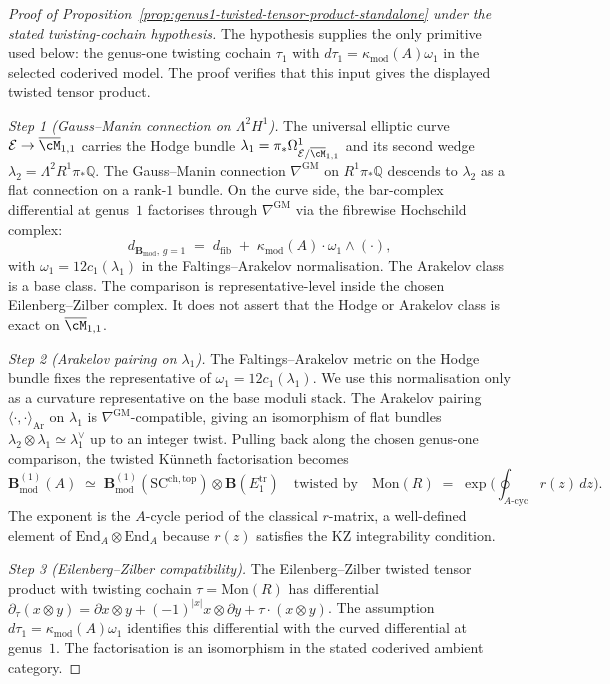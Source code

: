 \documentclass[11pt]{amsart}
\theoremstyle{definition}
\theoremstyle{remark}
\providecommand{\Bmod}{\mathbf{B}_{\mathrm{mod}}}
\begin{document}
\begin{proof}[Proof of Proposition~\ref{prop:genus1-twisted-tensor-product-standalone}
under the stated twisting-cochain hypothesis]
The hypothesis supplies the only primitive used below: the
genus-one twisting cochain $\tau_1$ with
$d\tau_1=\kappa_{\mathrm{mod}}(A)\omega_1$ in the selected coderived
model.  The proof verifies that this input gives the displayed
twisted tensor product.

\emph{Step 1 (Gauss--Manin connection on $\Lambda^2 H^1$).}
The universal elliptic curve
$\mathcal{E} \to \overline{\cM}_{1,1}$ carries the Hodge bundle
$\lambda_1 = \pi_* \Omega^1_{\mathcal{E}/\overline{\cM}_{1,1}}$ and
its second wedge
$\lambda_2 = \Lambda^2 R^1\pi_* \mathbb{Q}$. The Gauss--Manin
connection $\nabla^{\mathrm{GM}}$ on
$R^1\pi_* \mathbb{Q}$ descends to $\lambda_2$ as a flat connection
on a rank-$1$ bundle. On the curve side, the bar-complex differential
at genus~$1$ factorises through $\nabla^{\mathrm{GM}}$ via the
fibrewise Hochschild complex:
\[
  d_{\Bmod,\, g=1}
  \;=\;
    d_{\mathrm{fib}} \;+\; \kappa_{\mathrm{mod}}(A) \cdot \omega_1
    \wedge (\cdot),
\]
with $\omega_1=12c_1(\lambda_1)$ in the Faltings--Arakelov
normalisation. The Arakelov class is a base class.  The comparison is
representative-level inside the chosen Eilenberg--Zilber complex.  It
does not assert that the Hodge or Arakelov class is exact on
$\overline{\cM}_{1,1}$.

\emph{Step 2 (Arakelov pairing on $\lambda_1$).}
The Faltings--Arakelov metric on the Hodge bundle fixes the
representative of $\omega_1=12c_1(\lambda_1)$.  We use this
normalisation only as a curvature representative on the base
moduli stack.  The Arakelov pairing
$\langle\cdot, \cdot\rangle_{\mathrm{Ar}}$ on
$\lambda_1$ is $\nabla^{\mathrm{GM}}$-compatible, giving an
isomorphism of flat bundles
$\lambda_2 \otimes \lambda_1 \simeq \lambda_1^\vee$ up to an integer
twist. Pulling back along the chosen genus-one comparison, the
twisted K\"unneth factorisation
becomes
\[
  \Bmod^{(1)}(A)
  \;\simeq\;
  \Bmod^{(1)}(\mathrm{SC}^{\mathrm{ch,top}})
  \otimes \mathbf{B}(E_1^{\mathrm{tr}})
  \quad\text{twisted by}\quad
  \mathrm{Mon}(R) \;=\; \exp\!\bigl(\oint_{A\text{-cyc}} r(z)\, dz\bigr).
\]
The exponent is the $A$-cycle period of the classical $r$-matrix, a
well-defined element of
$\mathrm{End}_A \otimes \mathrm{End}_A$ because $r(z)$ satisfies the
KZ integrability condition.

\emph{Step 3 (Eilenberg--Zilber compatibility).}
The Eilenberg--Zilber twisted tensor product with twisting cochain
$\tau = \mathrm{Mon}(R)$ has differential
$\partial_\tau(x \otimes y) = \partial x \otimes y +
(-1)^{|x|} x \otimes \partial y + \tau \cdot (x \otimes y)$.
The assumption $d\tau_1=\kappa_{\mathrm{mod}}(A)\omega_1$ identifies
this differential with the curved differential at genus~$1$.  The
factorisation is an isomorphism in the stated coderived ambient
category.
\end{proof}
\end{document}
